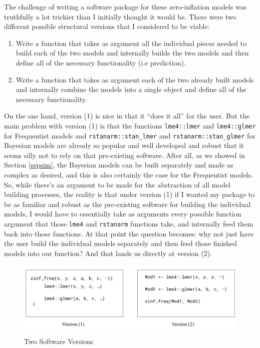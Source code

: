 \documentclass[12pt,twoside]{reedthesis}
\providecommand{\tightlist}{%
  \setlength{\itemsep}{0pt}\setlength{\parskip}{0pt}}
\begin{document}
The challenge of writing a software package for these zero-inflation models was truthfully a lot trickier than I initially thought it would be. There were two different possible structural versions that I considered to be viable:
\begin{enumerate}
\def\labelenumi{\arabic{enumi}.}
\tightlist
\item
  Write a function that takes as argument all the individual pieces needed to build each of the two models and internally builds the two models and then define all of the necessary functionality (i.e prediction).
\item
  Write a function that takes as argument each of the two already built models and internally combine the models into a single object and define all of the necessary functionality.
\end{enumerate}
On the one hand, version (1) is nice in that it ``does it all'' for the user. But the main problem with version (1) is that the functions \texttt{lme4::lmer} and \texttt{lme4::glmer} for Frequentist models and \texttt{rstanarm::stan\_lmer} and \texttt{rstanarm::stan\_glmer} for Bayesian models are already so popular and well developed and robust that it seems silly not to rely on that pre-existing software. After all, as we showed in Section \ref{sepsim}, the Bayesian models can be built separately and made as complex as desired, and this is also certainly the case for the Frequentist models. So, while there's an argument to be made for the abstraction of all model building processes, the reality is that under version (1) if I wanted my package to be as familiar and robust as the pre-existing software for building the individual models, I would have to essentially take as arguments every possible function argument that those \texttt{lme4} and \texttt{rstanarm} functions take, and internally feed them back into those functions. At that point the question becomes: why not just have the user build the individual models separately and then feed those finished models into our function? And that lands us directly at version (2).
\begin{figure}

{\centering \includegraphics[width=0.9\linewidth]{figure/v1v2} 

}

\caption{Two Software Versions}\label{fig:tbl2}
\end{figure}
\end{document}

